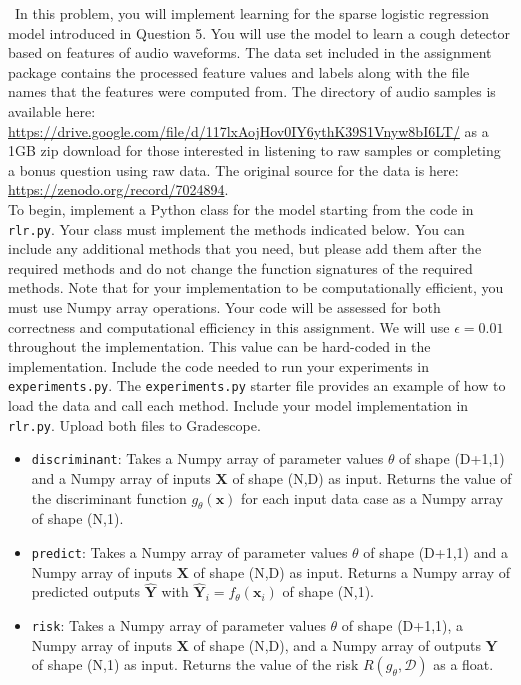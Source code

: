 \documentclass[11pt]{article}
\newcommand{\mbf}[1]{{\mathbf{#1}}}
\begin{document}
\begin{problem}{50} ~In this problem, you will implement learning for the sparse logistic regression model introduced in Question 5. You will use the model to learn a cough detector based on features of audio waveforms. The data set included in the assignment package contains the processed feature values and labels along with the file names that the features were computed from. The directory of audio samples is available here: \url{https://drive.google.com/file/d/117lxAojHov0IY6ythK39S1Vnyw8bI6LT/} as a 1GB zip download for those interested in listening to raw samples or completing a bonus question using raw data. The original source for the data is here: \url{https://zenodo.org/record/7024894}.\\

To begin, implement a Python class for the model starting from the code in \verb|rlr.py|. Your class must implement the methods indicated below. You can include any additional methods that you need, but please add them after the required methods and do not change the function signatures of the required methods. Note that for your implementation to be computationally efficient, you must use Numpy array operations. Your code will be assessed for both correctness and computational efficiency in this assignment. We will use $\epsilon=0.01$ throughout the implementation. This value can be hard-coded in the implementation. Include the code needed to run your experiments in \verb|experiments.py|. The \verb|experiments.py| starter file provides an example of how to load the data and call each method. Include your model implementation in \verb|rlr.py|. Upload both files to Gradescope. 
    
\begin{itemize}

\item \verb|discriminant|: Takes a Numpy array of parameter values $\theta$ of shape (D+1,1) and a Numpy array of inputs $\mbf{X}$ of shape (N,D) as input. Returns the value of the discriminant function $g_{\theta}(\mbf{x})$ for each input data case as a Numpy array of shape (N,1).

\item   \verb|predict|: Takes a Numpy array of parameter values $\theta$ of shape (D+1,1) and a Numpy array of inputs $\mbf{X}$ of shape (N,D) as input. Returns a Numpy array of predicted outputs $\hat{\mbf{Y}}$ with $\hat{\mbf{Y}}_i = f_{\theta}(\mbf{x}_i)$ of shape (N,1).

\item  \verb|risk|: Takes a Numpy array of parameter values $\theta$ of shape (D+1,1),  a Numpy array of inputs $\mbf{X}$ of shape (N,D), and a Numpy array of outputs $\mbf{Y}$ of shape (N,1) as input. Returns the value of the risk $R(g_{\theta},\mathcal{D})$ as a float. 


\end{itemize}
\end{problem}
\end{document}
